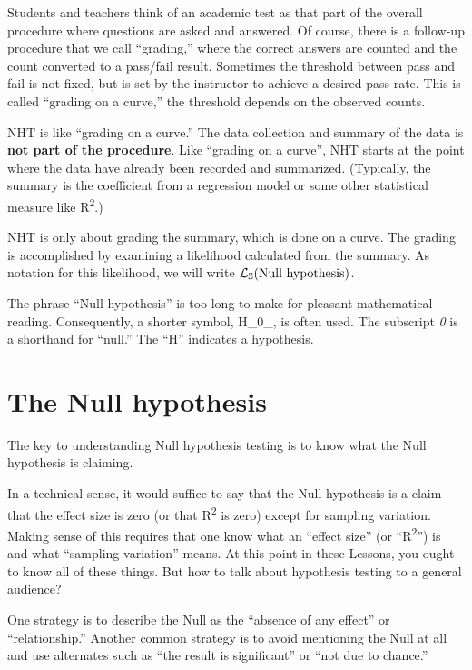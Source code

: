 \documentclass[
  letterpaper,
  DIV=11,
  numbers=noendperiod,
  oneside]{scrreprt}
\begin{document}
Students and teachers think of an academic test as that part of the
overall procedure where questions are asked and answered. Of course,
there is a follow-up procedure that we call ``grading,'' where the
correct answers are counted and the count converted to a pass/fail
result. Sometimes the threshold between pass and fail is not fixed, but
is set by the instructor to achieve a desired pass rate. This is called
``grading on a curve,'' the threshold depends on the observed counts.

NHT is like ``grading on a curve.'' The data collection and summary of
the data is \textbf{not part of the procedure}. Like ``grading on a
curve'', NHT starts at the point where the data have already been
recorded and summarized. (Typically, the summary is the coefficient from
a regression model or some other statistical measure like
R\textsuperscript{2}.)

NHT is only about grading the summary, which is done on a curve. The
grading is accomplished by examining a likelihood calculated from the
summary. As notation for this likelihood, we will write
\({\cal L}_{\mathbb{S}}(\text{Null hypothesis})\).

The phrase ``Null hypothesis'' is too long to make for pleasant
mathematical reading. Consequently, a shorter symbol, H\_0\_, is often
used. The subscript \emph{0} is a shorthand for ``null.'' The ``H''
indicates a hypothesis.

\hypertarget{the-null-hypothesis}{%
\section{The Null hypothesis}\label{the-null-hypothesis}}

The key to understanding Null hypothesis testing is to know what the
Null hypothesis is claiming.

In a technical sense, it would suffice to say that the Null hypothesis
is a claim that the effect size is zero (or that R\textsuperscript{2} is
zero) except for sampling variation. Making sense of this requires that
one know what an ``effect size'' (or ``R\textsuperscript{2}'') is and
what ``sampling variation'' means. At this point in these Lessons, you
ought to know all of these things. But how to talk about hypothesis
testing to a general audience?

One strategy is to describe the Null as the ``absence of any effect'' or
``relationship.'' Another common strategy is to avoid mentioning the
Null at all and use alternates such as ``the result is significant'' or
``not due to chance.''
\end{document}
